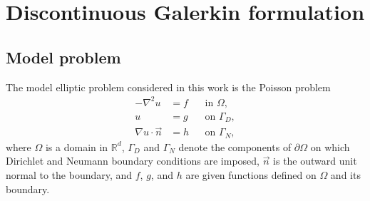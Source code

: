 \section{Discontinuous Galerkin formulation}\label{sec:\chap:DG}

\subsection{Model problem}
The model elliptic problem considered in this work is the Poisson problem
\begin{equation}\label{eq:\chap:poisson}
\begin{aligned}
-\nabla^2 u &= f &&\text{in } \Omega, \\
u &= g &&\text{on } \Gamma_D, \\
\nabla u \cdot \vec{n} &= h &&\text{on } \Gamma_N,
\end{aligned}
\end{equation}
where $\Omega$ is a domain in $\mathbb{R}^d$, $\Gamma_D$ and $\Gamma_N$ denote the components of $\partial \Omega$ on which Dirichlet and Neumann boundary conditions are imposed, $\vec{n}$ is the outward unit normal to the boundary, and $f$, $g$, and $h$ are given functions defined on $\Omega$ and its boundary.

